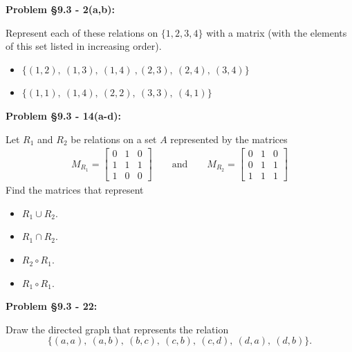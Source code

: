 \documentclass{article}
\newenvironment{problem}[1]
    {\begin{mdframed}[default]
    \textbf{Problem #1:}
    }
    {\end{mdframed}
    }
\begin{document}
\begin{problem}{\S 9.3 - 2(a,b)}
Represent each of these relations on $\{ 1, 2, 3, 4 \}$ with a matrix (with the elements of this set listed in increasing order).
\begin{itemize}
    \item[(a)] $\{ (1,2),~(1,3),~(1,4)~,(2,3),~(2,4),~(3,4) \}$
    \item[(b)] $\{ (1,1),~(1,4),~(2,2),~(3,3),~(4,1) \}$
\end{itemize}
\end{problem}


\begin{problem}{\S 9.3 - 14(a-d)}
Let $R_1$ and $R_2$ be relations on a set $A$ represented by the matrices
\begin{align*}
    M_{R_1} = \begin{bmatrix} 0 & 1 & 0 \\ 1 & 1 & 1 \\ 1 & 0 & 0 \end{bmatrix} \qquad \textrm{and} \qquad
    M_{R_2} = \begin{bmatrix} 0 & 1 & 0 \\ 0 & 1 & 1 \\ 1 & 1 & 1 \end{bmatrix}
\end{align*}
Find the matrices that represent
\begin{itemize}
    \item[(a)] $R_1 \cup R_2$.
    \item[(b)] $R_1 \cap R_2$.
    \item[(c)] $R_2 \circ R_1$.
    \item[(d)] $R_1 \circ R_1$.
\end{itemize}
\end{problem}


\begin{problem}{\S 9.3 - 22}
Draw the directed graph that represents the relation \[ \{ (a,a),~(a,b),~(b,c),~(c,b),~(c,d),~(d,a),~(d,b) \}. \]
\end{problem}
\end{document}
